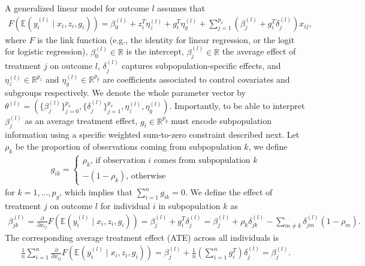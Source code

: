 \documentclass[pdflatex,sn-mathphys-num]{sn-jnl}%
\theoremstyle{thmstyleone}%
\theoremstyle{thmstyletwo}%
\theoremstyle{thmstylethree}%
\begin{document}
A generalized linear model for outcome $l$ assumes that
\begin{align}
  F( \mathbb E (y_i^{(l)} \mid x_i, z_i, g_i) )=
  \beta_0^{(l)} + z_i^T \eta_z^{(l)} + g_i^T \eta_g^{(l)} + \sum_{j=1}^{p_x} (\beta_j^{(l)} + g_i^T \delta_j^{(l)}) x_{ij},
\label{eq:outcome_equation}
\end{align}
where $F$ is the link function (e.g., the identity for linear regression, or the logit for logistic regression),
$\beta_0^{(l)} \in \mathbb{R}$ is the intercept,
$\beta_j^{(l)} \in \mathbb{R}$ the average effect of treatment $j$ on outcome $l$,
$\delta_j^{(l)}$ captures subpopulation-specific effects,
and $\eta_z^{(l)} \in \mathbb{R}^{p_z}$ and $\eta_g^{(l)} \in \mathbb{R}^{p_g}$ are coefficients associated to control covariates and subgroups respectively.
We denote the whole parameter vector by $\theta^{(l)}= (\{ \beta_j^{(l)} \}_{j=0}^{p_x}, \{ \delta_j^{(l)} \}_{j=1}^{p_x}, \eta_z^{(l)}, \eta_g^{(l)})$.
Importantly, to be able to interpret $\beta_j^{(l)}$ as an average treatment effect, $g_i \in \mathbb{R}^{p_g}$ must encode subpopulation information using a specific weighted sum-to-zero constraint described next.
Let $\rho_k$ be the proportion of observations coming from subpopulation $k$, we define
\begin{align}
  g_{ik}= \begin{cases}
    \rho_k  \mbox{, if observation } i \mbox{ comes from subpopulation } k \\
    - (1 - \rho_k) \mbox{, otherwise}
    \end{cases}
\nonumber
\end{align}
for $k=1,\ldots,p_g$, which implies that $\sum_{i=1}^n g_{ik}=0$.
We define the effect of treatment $j$ on outcome $l$ for individual $i$ in subpopulation $k$ as
\begin{align}
\beta_{jk}^{(l)}=  \frac{\partial}{\partial x_{ij}} F(\mathbb E (y_i^{(l)} \mid x_i, z_i, g_i)) 
= \beta_j^{(l)} + g_i^T \delta_j^{(l)}
= \beta_j^{(l)} + \rho_k \delta_{jk}^{(l)} - \sum_{m \neq k} \delta_{jm}^{(l)} (1 - \rho_m).
\nonumber
\end{align}
The corresponding average treatment effect (ATE) across all individuals is
\begin{align}
\frac{1}{n} \sum_{i=1}^n \frac{\partial}{\partial x_{ij}} F(\mathbb E (y_i^{(l)} \mid x_i, z_i, g_i))
= \beta_j^{(l)} + \frac{1}{n} \left( \sum_{i=1}^n g_i^T \right) \delta_j^{(l)}= \beta_j^{(l)}.
\nonumber
\end{align}
\end{document}
